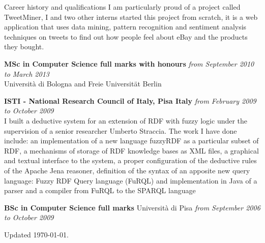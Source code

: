 \documentclass{resume}
\begin{document}
\begin{rSection}{Career history and qualifications}
			I am particularly proud of a project called TweetMiner, 
			I and two other interns started this project from scratch,
			it is a web application that uses data mining, pattern recognition and sentiment analysis 
			techniques on tweets to find out how people feel about eBay and the products they bought. 

		{\bf MSc in Computer Science full marks with honours} \hfill {\em from September 2010 to March 2013} \\
		Universit\`a di Bologna and Freie Universit\"at Berlin 

		{\bf ISTI - National Research Council of Italy, Pisa Italy} \hfill {\em from February 2009 to October 2009}\\
			I built a deductive system for an extension of RDF with fuzzy logic under the supervision of a senior researcher Umberto Straccia.
			The work I have done include:
			an implementation of a new language fuzzyRDF as a particular subset of RDF,
			a mechanisms of storage of RDF knowledge bases as XML files,
			a graphical and textual interface to the system,
			a proper configuration of the deductive rules of the Apache Jena reasoner,
			definition of the syntax of an apposite new query language: Fuzzy RDF Query language (FuRQL)
			and implementation in Java of a parser and a compiler from FuRQL to the SPARQL language 

		{\bf BSc in Computer Science full marks} Universit\`a di Pisa \hfill {\em from September 2006 to October 2009} \\
	\end{rSection}
	\begin{rSection}{}
		Updated \today.
	\end{rSection}
\end{document}
